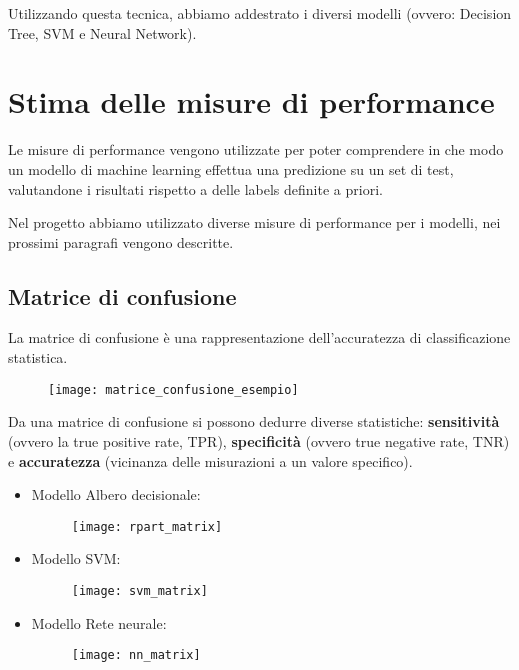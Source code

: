Utilizzando questa tecnica, abbiamo addestrato i diversi modelli (ovvero: Decision Tree, SVM e Neural Network).


\section{Stima delle misure di performance}

Le misure di performance vengono utilizzate per poter comprendere in che modo un modello di machine learning effettua una predizione su un set di test, valutandone i risultati rispetto a delle labels definite a priori.

Nel progetto abbiamo utilizzato diverse misure di performance per i modelli, nei prossimi paragrafi vengono descritte.

\subsection{Matrice di confusione}
La matrice di confusione è una rappresentazione dell'accuratezza di classificazione statistica.

\begin{figure}[H]
	\centering
	\texttt{[image: matrice\_confusione\_esempio]}
\end{figure}

Da una matrice di confusione si possono dedurre diverse statistiche: \textbf{sensitività} (ovvero la true positive rate, TPR), \textbf{specificità} (ovvero true negative rate, TNR) e \textbf{accuratezza} (vicinanza delle misurazioni a un valore specifico).

\newpage

\begin{itemize}
	\item Modello Albero decisionale:
    \begin{figure}[H]
     	\centering
	    \texttt{[image: rpart\_matrix]}	
    \end{figure}	
    \item Modello SVM:
    \begin{figure}[H]
        \centering
        \texttt{[image: svm\_matrix]}	
    \end{figure}
	\item Modello Rete neurale:
	\begin{figure}[H]
		\centering
		\texttt{[image: nn\_matrix]}	
	\end{figure}


\end{itemize}

